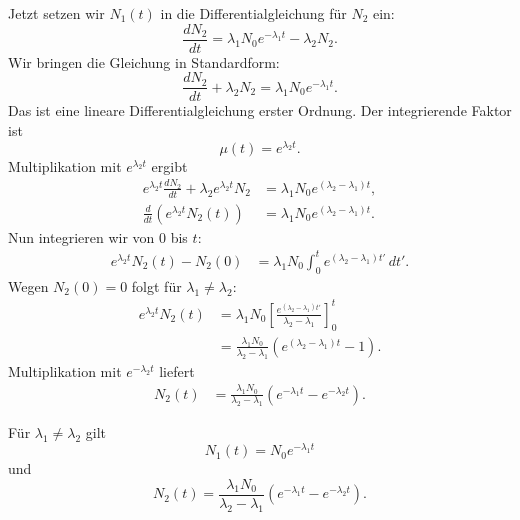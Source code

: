 \documentclass[11pt,a4paper]{scrartcl}
\begin{document}
\begin{enumerate}[label=(\alph*)]
            \begin{calculationbox}
                Jetzt setzen wir $N_1(t)$ in die Differentialgleichung für $N_2$ ein:
                \[
                    \frac{dN_2}{dt}=\lambda_1N_0e^{-\lambda_1t}-\lambda_2N_2.
                \]
                Wir bringen die Gleichung in Standardform:
                \[
                    \frac{dN_2}{dt}+\lambda_2N_2=\lambda_1N_0e^{-\lambda_1t}.
                \]
                Das ist eine lineare Differentialgleichung erster Ordnung.
                Der integrierende Faktor ist
                \[
                    \mu(t)=e^{\lambda_2t}.
                \]
                Multiplikation mit $e^{\lambda_2t}$ ergibt
                \begin{align*}
                    e^{\lambda_2t}\frac{dN_2}{dt}+\lambda_2e^{\lambda_2t}N_2
                    &=\lambda_1N_0e^{(\lambda_2-\lambda_1)t},\\
                    \frac{d}{dt}\left(e^{\lambda_2t}N_2(t)\right)
                    &=\lambda_1N_0e^{(\lambda_2-\lambda_1)t}.
                \end{align*}
                Nun integrieren wir von $0$ bis $t$:
                \begin{align*}
                    e^{\lambda_2t}N_2(t)-N_2(0)
                    &=\lambda_1N_0\int_0^t e^{(\lambda_2-\lambda_1)t'}\,dt'.
                \end{align*}
                Wegen $N_2(0)=0$ folgt für $\lambda_1\neq\lambda_2$:
                \begin{align*}
                    e^{\lambda_2t}N_2(t)
                    &=\lambda_1N_0
                    \left[\frac{e^{(\lambda_2-\lambda_1)t'} }{\lambda_2-\lambda_1}\right]_0^t\\
                    &=\frac{\lambda_1N_0}{\lambda_2-\lambda_1}
                    \left(e^{(\lambda_2-\lambda_1)t}-1\right).
                \end{align*}
                Multiplikation mit $e^{-\lambda_2t}$ liefert
                \begin{align*}
                    N_2(t)
                    &=\frac{\lambda_1N_0}{\lambda_2-\lambda_1}
                    \left(e^{-\lambda_1t}-e^{-\lambda_2t}\right).
                \end{align*}
            \end{calculationbox}

            \begin{answerbox}
                Für $\lambda_1\neq\lambda_2$ gilt
                \[
                    \boxed{N_1(t)=N_0e^{-\lambda_1t}}
                \]
                und
                \[
                    \boxed{
                    N_2(t)=\frac{\lambda_1N_0}{\lambda_2-\lambda_1}
                    \left(e^{-\lambda_1t}-e^{-\lambda_2t}\right).
                    }
                \]
            \end{answerbox}


\end{enumerate}
\end{document}

